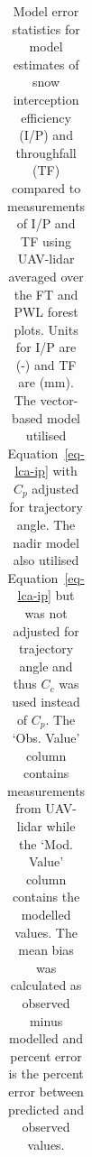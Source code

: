 \documentclass[
  letterpaper,
]{tex/uofsthesis-cs}
\begin{document}
\begin{longtable}[]{@{}
  >{\raggedright\arraybackslash}p{}
  >{\raggedright\arraybackslash}p{}
  >{\raggedright\arraybackslash}p{}
  >{\raggedright\arraybackslash}p{}
  >{\raggedleft\arraybackslash}p{}
  >{\raggedleft\arraybackslash}p{}
  >{\raggedleft\arraybackslash}p{}
  >{\raggedleft\arraybackslash}p{}@{}}

\caption{\label{tbl-vb-plot-err}Model error statistics for model
estimates of snow interception efficiency (I/P) and throughfall (TF)
compared to measurements of I/P and TF using UAV-lidar averaged over the
FT and PWL forest plots. Units for I/P are (-) and TF are (mm). The
vector-based model utilised Equation~\ref{eq-lca-ip} with \(C_p\)
adjusted for trajectory angle. The nadir model also utilised
Equation~\ref{eq-lca-ip} but was not adjusted for trajectory angle and
thus \(C_c\) was used instead of \(C_p\). The `Obs. Value' column
contains measurements from UAV-lidar while the `Mod. Value' column
contains the modelled values. The mean bias was calculated as observed
minus modelled and percent error is the percent error between predicted
and observed values.}

\tabularnewline


\end{longtable}
\end{document}
